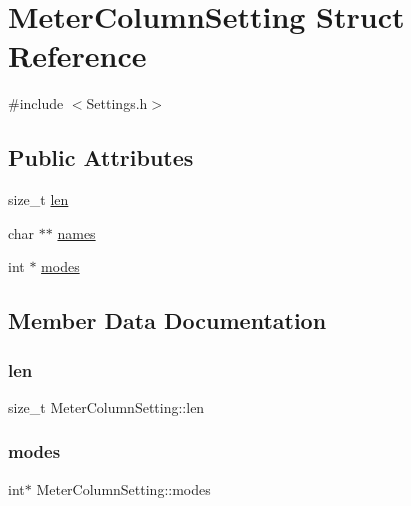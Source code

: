 \hypertarget{structMeterColumnSetting}{}\section{Meter\+Column\+Setting Struct Reference}
\label{structMeterColumnSetting}


{\ttfamily \#include $<$Settings.\+h$>$}

\subsection*{Public Attributes}
\begin{DoxyCompactItemize}
\item 
size\+\_\+t \hyperlink{structMeterColumnSetting_a10a14cb07942cd6880d93343d92b457c}{len}
\item 
char $\ast$$\ast$ \hyperlink{structMeterColumnSetting_a30d70e0584a13084bbf9f1211c1e65d0}{names}
\item 
int $\ast$ \hyperlink{structMeterColumnSetting_ac715e8a1eeb8d51fc331df496baaa2bc}{modes}
\end{DoxyCompactItemize}


\subsection{Member Data Documentation}
\mbox{\label{structMeterColumnSetting_a10a14cb07942cd6880d93343d92b457c}} 
\subsubsection{\texorpdfstring{len}{len}}
{\footnotesize\ttfamily size\+\_\+t Meter\+Column\+Setting\+::len}

\mbox{\label{structMeterColumnSetting_ac715e8a1eeb8d51fc331df496baaa2bc}} 
\subsubsection{\texorpdfstring{modes}{modes}}
{\footnotesize\ttfamily int$\ast$ Meter\+Column\+Setting\+::modes}

